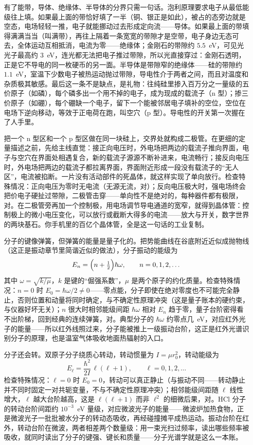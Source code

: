 有了能带，导体、绝缘体、半导体的分界只需一句话。泡利原理要求电子从最低能级往上填。如果最上面的带恰好填了一半（铜、银正是如此），被占的态旁边就是空态，电场轻轻一推，电子就能挪动过去形成定向流——导体。如果最上面的带填得满满当当（叫满带），再往上隔着一条宽宽的带隙才是空带，电子身边无态可去，全体运动互相抵消，电流为零——绝缘体；金刚石的带隙约 \(5.5\)~eV，可见光光子最高约 \(3\)~eV，连光都无法把电子推过带隙，所以光直接穿过：金刚石透明，正是它不导电的同一枚硬币的另一面。半导体是带隙窄的绝缘体——硅的带隙约 \(1.1\)~eV，室温下少数电子被热运动抛过带隙，导电性介于两者之间，而且对温度和杂质极其敏感。最后这一条不是缺点，是礼物：往纯硅里掺入百万分之一量级的五价原子（如磷），每个磷多出一个用不掉的电子，成为现成的载流子（n 型）；掺三价原子（如硼），每个硼缺一个电子，留下一个能被邻居电子填补的空位，空位在电场下逆向移动，等效于正电荷在跑，叫空穴（p 型）。导电性的开关第一次握在了人手里。

把一个 n 型区和一个 p 型区做在同一块硅上，交界处就构成二极管。在更细的定量描述之前，先给主线直觉：接正向电压时，外电场把两边的载流子推向界面，电子与空穴在界面处相遇复合，新的载流子源源不断补进来，电流畅行；接反向电压时，外电场把两边的载流子都拉离界面，界面附近形成一段没有载流子的“无人区”，电流被掐断。一片没有活动部件的死晶体，就这样实现了单向放行。检查特殊情况：正向电压为零时无电流（无源无流，对）；反向电压极大时，强电场终会把价电子硬扯过带隙，二极管击穿——单向性不是绝对的，每种器件都有极限，对。在二极管旁再加一个控制极，用电场调节导电通道的宽窄，就得到晶体管：控制极上的微小电压变化，可以放行或截断大得多的电流——放大与开关，数字世界的两块基石。你手机里的百亿个晶体管，全是这一句话的工业复制。

\begin{mathbridge}
分子的键像弹簧，但弹簧的能量是量子化的。把势能曲线在谷底附近近似成抛物线（这正是振动章节里简谐近似的做法），分子振动的能级为
\[
E_n=\Bigl(n+\tfrac12\Bigr)\hbar\omega,\qquad n=0,1,2,\dots
\]
其中 \(\omega=\sqrt{k/\mu}\)，\(k\) 是键的“倔强系数”，\(\mu\) 是两个原子的约化质量。检查特殊情况：\(n=0\) 时 \(E_0=\hbar\omega/2\neq0\)——零点能，分子即使在绝对零度也不可能完全静止，否则位置和动量将同时确定，与不确定性原理冲突（这是量子账本的硬约束，与仪器好坏无关）；\(n\) 很大时相邻能级间距 \(\hbar\omega\) 相对 \(E_n\) 趋于零，量子台阶密得看不出阶梯，回到经典的连续弹簧，对。典型分子的 \(\hbar\omega\) 约零点几~eV，对应红外光子的能量——所以红外线照过来，分子能被推上一级振动台阶，这正是红外光谱识别分子的原理，也是温室气体吸收地面热辐射的入口。

分子还会转。双原子分子绕质心转动，转动惯量为 \(I=\mu r_0^2\)，转动能级为
\[
E_\ell=\frac{\hbar^2}{2I}\,\ell(\ell+1),\qquad \ell=0,1,2,\dots
\]
检查特殊情况：\(\ell=0\) 时 \(E_0=0\)，转动可以真正静止（与振动不同——转动静止并不同时固定一对共轭变量，不与不确定性原理冲突）；相邻能级间距随 \(\ell\) 线性增大，\(\ell\) 越大台阶越高，这是 \(\ell(\ell+1)\) 而非 \(\ell^2\) 的细微后果，对。HCl 分子的转动台阶间距约 \(10^{-3}\)~eV 量级，对应微波光子的能量——微波炉加热食物，正是微波光子一批批被水分子的转动态吸收，再经碰撞摊平成热运动。振动台阶在红外，转动台阶在微波，两者相差两个数量级：用一束光扫过频率，读出哪些频率被吸收，就同时读出了分子的键强、键长和质量——分子光谱学就是这么一本账。
\end{mathbridge}


